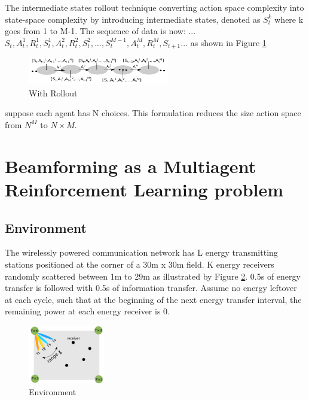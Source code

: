 \documentclass[journal]{IEEEtran}
\begin{document}
The intermediate states rollout technique converting action space complexity into state-space complexity by introducing intermediate states, denoted as $S_t^k$ where k goes from 1 to M-1. The sequence of data is now: ...$S_t,A_t^1,R_t^1,S_t^1,A_t^2,R_t^2, S_t^2, ... , S_t^{M-1},A_t^M,R_t^M,S_{t+1}$... as shown in Figure \ref{fig:with}

\begin{figure}[H]
\centering
\includegraphics[width=0.55\textwidth]{with.png}
\caption{With Rollout}
\label{fig:with}
\end{figure}
suppose each agent has N choices. This formulation reduces the size action space from $N^M$ to $N \times M$.


\section{Beamforming as a Multiagent Reinforcement Learning problem}
\subsection{Environment}
The wirelessly powered communication network has L energy transmitting stations positioned at the corner of a 30m x 30m field. K energy receivers randomly scattered between 1m to 29m as illustrated by Figure \ref{fig:environment}. 0.5s of energy transfer is followed with 0.5s of information transfer. Assume no energy leftover at each cycle, such that at the beginning of the next energy transfer interval, the remaining power at each energy receiver is 0.


\begin{figure}[H]
\centering
\includegraphics[width=0.3\textwidth]{environment.png}
\caption{Environment}
\label{fig:environment}
\end{figure}
\end{document}
